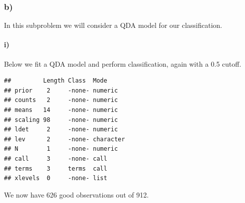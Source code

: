 \documentclass[
]{article}
\newenvironment{Shaded}{\begin{snugshade}}{\end{snugshade}}
\newcommand{\AttributeTok}[1]{\textcolor[rgb]{0.77,0.63,0.00}{#1}}
\newcommand{\CommentTok}[1]{\textcolor[rgb]{0.56,0.35,0.01}{\textit{#1}}}
\newcommand{\FunctionTok}[1]{\textcolor[rgb]{0.00,0.00,0.00}{#1}}
\newcommand{\NormalTok}[1]{#1}
\newcommand{\OtherTok}[1]{\textcolor[rgb]{0.56,0.35,0.01}{#1}}
\newcommand{\SpecialCharTok}[1]{\textcolor[rgb]{0.00,0.00,0.00}{#1}}
\begin{document}
\hypertarget{b-2}{%
\subsubsection{b)}\label{b-2}}

In this subproblem we will consider a QDA model for our classification.

\hypertarget{i-4}{%
\paragraph{i)}\label{i-4}}

Below we fit a QDA model and perform classification, again with a 0.5
cutoff.

\begin{Shaded}
\end{Shaded}

\begin{verbatim}
##         Length Class  Mode     
## prior    2     -none- numeric  
## counts   2     -none- numeric  
## means   14     -none- numeric  
## scaling 98     -none- numeric  
## ldet     2     -none- numeric  
## lev      2     -none- character
## N        1     -none- numeric  
## call     3     -none- call     
## terms    3     terms  call     
## xlevels  0     -none- list
\end{verbatim}

We now have 626 good observations out of 912.
\end{document}
